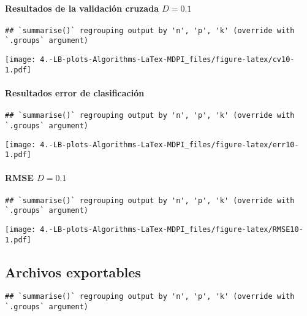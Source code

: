 \documentclass[
]{article}
\begin{document}
\hypertarget{resultados-de-la-validaciuxf3n-cruzada-d0.1}{%
\paragraph{\texorpdfstring{Resultados de la validación cruzada
\(D=0.1\)}{Resultados de la validación cruzada D=0.1}}\label{resultados-de-la-validaciuxf3n-cruzada-d0.1}}

\begin{verbatim}
## `summarise()` regrouping output by 'n', 'p', 'k' (override with `.groups` argument)
\end{verbatim}

\texttt{[image: 4.-LB-plots-Algorithms-LaTex-MDPI\_files/figure-latex/cv10-1.pdf]}

\hypertarget{resultados-error-de-clasificaciuxf3n-3}{%
\paragraph{Resultados error de
clasificación}\label{resultados-error-de-clasificaciuxf3n-3}}

\begin{verbatim}
## `summarise()` regrouping output by 'n', 'p', 'k' (override with `.groups` argument)
\end{verbatim}

\texttt{[image: 4.-LB-plots-Algorithms-LaTex-MDPI\_files/figure-latex/err10-1.pdf]}

\hypertarget{rmse-d0.1}{%
\paragraph{\texorpdfstring{RMSE
\(D=0.1\)}{RMSE D=0.1}}\label{rmse-d0.1}}

\begin{verbatim}
## `summarise()` regrouping output by 'n', 'p', 'k' (override with `.groups` argument)
\end{verbatim}

\texttt{[image: 4.-LB-plots-Algorithms-LaTex-MDPI\_files/figure-latex/RMSE10-1.pdf]}

\hypertarget{archivos-exportables}{%
\subsection{Archivos exportables}\label{archivos-exportables}}

\begin{verbatim}
## `summarise()` regrouping output by 'n', 'p', 'k' (override with `.groups` argument)
\end{verbatim}
\end{document}
